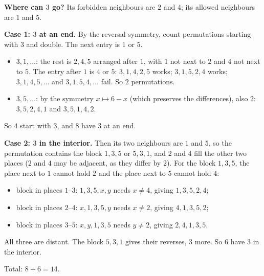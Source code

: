 \textbf{Where can $3$ go?} Its forbidden neighbours are $2$ and $4$; its allowed neighbours are $1$ and $5$.

\textbf{Case 1: $3$ at an end.} By the reversal symmetry, count permutations starting with $3$ and double. The next entry is $1$ or $5$.
\begin{itemize}
\item $3,1,\ldots$: the rest is $2,4,5$ arranged after $1$, with $1$ not next to $2$ and $4$ not next to $5$. The entry after $1$ is $4$ or $5$: $3,1,4,2,5$ works; $3,1,5,2,4$ works; $3,1,4,5,\dots$ and $3,1,5,4,\dots$ fail. So $2$ permutations.
\item $3,5,\ldots$: by the symmetry $x\mapsto6-x$ (which preserves the differences), also $2$: $3,5,2,4,1$ and $3,5,1,4,2$.
\end{itemize}
So $4$ start with $3$, and $8$ have $3$ at an end.

\textbf{Case 2: $3$ in the interior.} Then its two neighbours are $1$ and $5$, so the permutation contains the block $1,3,5$ or $5,3,1$, and $2$ and $4$ fill the other two places ($2$ and $4$ may be adjacent, as they differ by $2$). For the block $1,3,5$, the place next to $1$ cannot hold $2$ and the place next to $5$ cannot hold $4$:
\begin{itemize}
\item block in places $1$--$3$: $1,3,5,x,y$ needs $x\ne4$, giving $1,3,5,2,4$;
\item block in places $2$--$4$: $x,1,3,5,y$ needs $x\ne2$, giving $4,1,3,5,2$;
\item block in places $3$--$5$: $x,y,1,3,5$ needs $y\ne2$, giving $2,4,1,3,5$.
\end{itemize}
All three are distant. The block $5,3,1$ gives their reverses, $3$ more.
So $6$ have $3$ in the interior.

Total: $8+6=\boxed{14}$.
